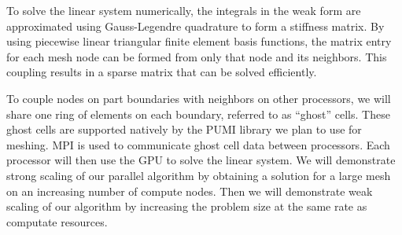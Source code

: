 \documentclass[12pt]{article}
\begin{document}
To solve the linear system numerically, the integrals in the weak form are
approximated using Gauss-Legendre quadrature to form a stiffness matrix. By
using piecewise linear triangular finite element basis functions, the matrix
entry for each mesh node can be formed from only that node and its neighbors.
This coupling results in a sparse matrix that can be solved efficiently.

To couple nodes on part boundaries with neighbors on other processors, we
will share one ring of elements on each boundary, referred to as ``ghost''
cells. These ghost cells are supported natively by the PUMI library we plan
to use for meshing. MPI is used to communicate ghost cell data between
processors. Each processor will then use the GPU to solve the linear system.
We will demonstrate strong scaling of our parallel algorithm by obtaining a
solution for a large mesh on an increasing number of compute nodes.
Then we will demonstrate weak scaling of our algorithm by increasing the
problem size at the same rate as computate resources.

\printbibliography
\end{document}
